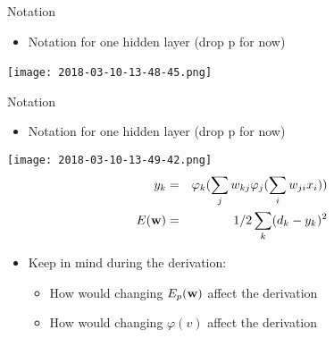 \documentclass[notes]{beamer}
\providecommand{\tightlist}{%
  \setlength{\itemsep}{0pt}\setlength{\parskip}{0pt}}
\begin{document}
\begin{frame}{Notation}

\begin{itemize}
\tightlist
\item
  Notation for one hidden layer (drop p for now)
\end{itemize}

\centering

\texttt{[image: 2018-03-10-13-48-45.png]} ~

\end{frame}

\begin{frame}{Notation}

\begin{itemize}
\tightlist
\item
  Notation for one hidden layer (drop p for now)
\end{itemize}

\centering 

\texttt{[image: 2018-03-10-13-49-42.png]}\\

\begin{eqnarray*}
   y_k &=& \varphi_k(\sum_j w_{kj} \varphi_j (\sum_i w_{ji} x_i)) \\
   E(\mathbf{w}) &=& 1/2 \sum_k (d_k - y_k)^2  
\end{eqnarray*}

\begin{itemize}
\tightlist
\item
  Keep in mind during the derivation:

  \begin{itemize}
  \tightlist
  \item
    How would changing \(E_p (\mathbf{w})\) affect the derivation
  \item
    How would changing \(\varphi (v)\) affect the derivation
  \end{itemize}
\end{itemize}

\end{frame}
\end{document}
